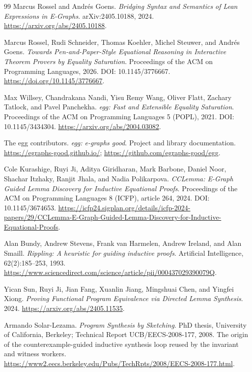 \begin{thebibliography}{99}
Marcus Rossel and Andr\'es Goens. \emph{Bridging Syntax and Semantics of Lean
Expressions in E-Graphs}. arXiv:2405.10188, 2024.
\url{https://arxiv.org/abs/2405.10188}.

Marcus Rossel, Rudi Schneider, Thomas Koehler, Michel Steuwer, and
Andr\'es Goens. \emph{Towards Pen-and-Paper-Style Equational Reasoning in
Interactive Theorem Provers by Equality Saturation}. Proceedings of the ACM
on Programming Languages, 2026. DOI: 10.1145/3776667.
\url{https://doi.org/10.1145/3776667}.

Max Willsey, Chandrakana Nandi, Yisu Remy Wang, Oliver Flatt,
Zachary Tatlock, and Pavel Panchekha. \emph{egg: Fast and Extensible Equality
Saturation}. Proceedings of the ACM on Programming Languages 5 (POPL), 2021.
DOI: 10.1145/3434304.
\url{https://arxiv.org/abs/2004.03082}.

The egg contributors. \emph{egg: e-graphs good}. Project and library
documentation.
\url{https://egraphs-good.github.io/};
\url{https://github.com/egraphs-good/egg}.


Cole Kurashige, Ruyi Ji, Aditya Giridharan, Mark Barbone, Daniel Noor,
Shachar Itzhaky, Ranjit Jhala, and Nadia Polikarpova.
\emph{CCLemma: E-Graph Guided Lemma Discovery for Inductive Equational
Proofs}. Proceedings of the ACM on Programming Languages 8 (ICFP),
article 264, 2024. DOI: 10.1145/3674653.
\url{https://icfp24.sigplan.org/details/icfp-2024-papers/29/CCLemma-E-Graph-Guided-Lemma-Discovery-for-Inductive-Equational-Proofs}.

Alan Bundy, Andrew Stevens, Frank van Harmelen, Andrew Ireland, and
Alan Smaill. \emph{Rippling: A heuristic for guiding inductive proofs}.
Artificial Intelligence, 62(2):185--253, 1993.
\url{https://www.sciencedirect.com/science/article/pii/000437029390079Q}.

Yican Sun, Ruyi Ji, Jian Fang, Xuanlin Jiang, Mingshuai Chen, and
Yingfei Xiong. \emph{Proving Functional Program Equivalence via Directed
Lemma Synthesis}. 2024.
\url{https://arxiv.org/abs/2405.11535}.

Armando Solar-Lezama. \emph{Program Synthesis by Sketching}. PhD thesis,
University of California, Berkeley; Technical Report UCB/EECS-2008-177, 2008.
The origin of the counterexample-guided inductive synthesis loop reused by
the invariant and witness workers.
\url{https://www2.eecs.berkeley.edu/Pubs/TechRpts/2008/EECS-2008-177.html}.


\end{thebibliography}
